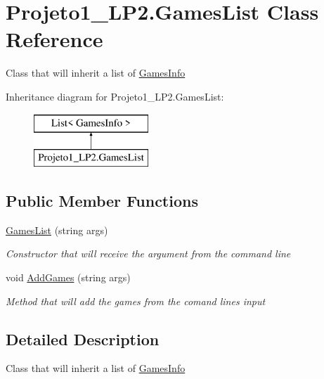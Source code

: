\hypertarget{class_projeto1___l_p2_1_1_games_list}{}\section{Projeto1\+\_\+\+L\+P2.\+Games\+List Class Reference}
\label{class_projeto1___l_p2_1_1_games_list}


Class that will inherit a list of \hyperlink{class_projeto1___l_p2_1_1_games_info}{Games\+Info}  


Inheritance diagram for Projeto1\+\_\+\+L\+P2.\+Games\+List\+:\begin{figure}[H]
\begin{center}
\leavevmode
\includegraphics[height=2.000000cm]{class_projeto1___l_p2_1_1_games_list}
\end{center}
\end{figure}
\subsection*{Public Member Functions}
\begin{DoxyCompactItemize}
\item 
\hyperlink{class_projeto1___l_p2_1_1_games_list_a34bdf1752a0423357225757b3173f28f}{Games\+List} (string args)
\begin{DoxyCompactList}\small\item\em Constructor that will receive the argument from the command line \end{DoxyCompactList}\item 
void \hyperlink{class_projeto1___l_p2_1_1_games_list_abe89d421fc6fd99fdac598b82dbbc001}{Add\+Games} (string args)
\begin{DoxyCompactList}\small\item\em Method that will add the games from the comand line\textquotesingle{}s input \end{DoxyCompactList}\end{DoxyCompactItemize}


\subsection{Detailed Description}
Class that will inherit a list of \hyperlink{class_projeto1___l_p2_1_1_games_info}{Games\+Info} 



